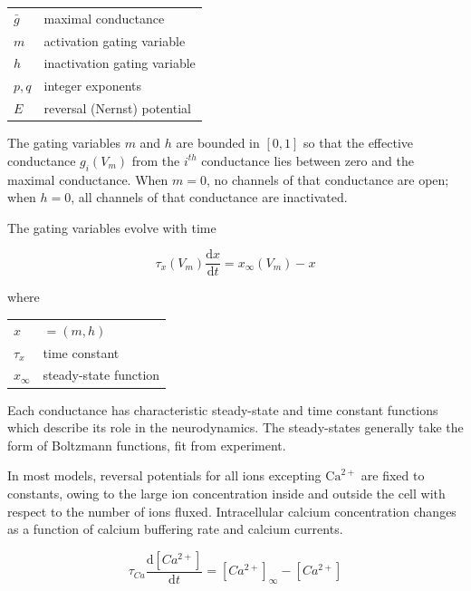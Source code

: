 \begin{tabular}{ll}
	$\bar{g}$    & maximal conductance \\
	$m$     	 & activation gating variable \\
	$h$          & inactivation gating variable \\
	$p,q$        & integer exponents \\
	$E$          & reversal (Nernst) potential \\
\end{tabular}

The gating variables $m$ and $h$ are bounded in $[0, 1]$ so that the effective conductance $g_i(V_m)$ from the $i^{th}$ conductance lies between zero and the maximal conductance. When $m=0$, no channels of that conductance are open; when $h = 0$, all channels of that conductance are inactivated.

The gating variables evolve with time

\begin{equation}
	\tau_x(V_m) \frac{\mathrm{d}x}{\mathrm{d}t} = x_{\infty}(V_m) - x
\end{equation}

where

\begin{tabular}{ll}
	$x$   		 & $=(m,h)$ \\
	$\tau_x$  	 & time constant \\
	$x_\infty$   & steady-state function
\end{tabular}

Each conductance has characteristic steady-state and time constant functions which describe its role in the neurodynamics. The steady-states generally take the form of Boltzmann functions, fit from experiment\autocite{TurrigianoSelectiveregulationcurrent1995}.

In most models, reversal potentials for all ions excepting $\mathrm{Ca}^{2+}$ are fixed to constants, owing to the large ion concentration inside and outside the cell with respect to the number of ions fluxed\autocite{DayanTheoreticalNeuroscience2001,Liumodelneuronactivitydependent1998}. Intracellular calcium concentration changes as a function of calcium buffering rate and calcium currents. 

\begin{equation} \label{eq:calcium}
	\tau_{Ca} \frac{\mathrm{d} \left[ Ca^{2+} \right]}{\mathrm{d}t} = \left[ Ca^{2+} \right]_\infty - \left[ Ca^{2+} \right]
\end{equation}

